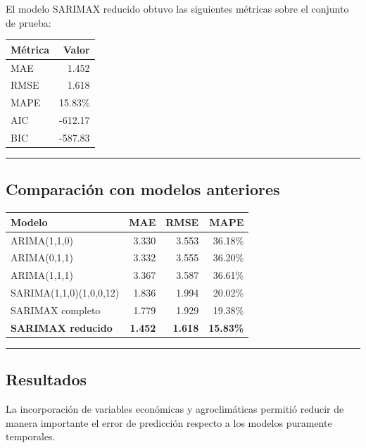 \documentclass[11pt]{article}
\begin{document}
El modelo SARIMAX reducido obtuvo las siguientes métricas sobre el
conjunto de prueba:

\begin{longtable}[]{@{}lr@{}}
\toprule\noalign{}
Métrica & Valor \\
\midrule\noalign{}
\endhead
\bottomrule\noalign{}
\endlastfoot
MAE & 1.452 \\
RMSE & 1.618 \\
MAPE & 15.83\% \\
AIC & -612.17 \\
BIC & -587.83 \\
\end{longtable}

\begin{center}\rule{0.5\linewidth}{0.5pt}\end{center}

\hypertarget{comparaciuxf3n-con-modelos-anteriores}{%
\subsection{Comparación con modelos
anteriores}\label{comparaciuxf3n-con-modelos-anteriores}}

\begin{longtable}[]{@{}lrrr@{}}
\toprule\noalign{}
Modelo & MAE & RMSE & MAPE \\
\midrule\noalign{}
\endhead
\bottomrule\noalign{}
\endlastfoot
ARIMA(1,1,0) & 3.330 & 3.553 & 36.18\% \\
ARIMA(0,1,1) & 3.332 & 3.555 & 36.20\% \\
ARIMA(1,1,1) & 3.367 & 3.587 & 36.61\% \\
SARIMA(1,1,0)(1,0,0,12) & 1.836 & 1.994 & 20.02\% \\
SARIMAX completo & 1.779 & 1.929 & 19.38\% \\
\textbf{SARIMAX reducido} & \textbf{1.452} & \textbf{1.618} &
\textbf{15.83\%} \\
\end{longtable}

\begin{center}\rule{0.5\linewidth}{0.5pt}\end{center}

\hypertarget{resultados}{%
\subsection{Resultados}\label{resultados}}

La incorporación de variables económicas y agroclimáticas permitió
reducir de manera importante el error de predicción respecto a los
modelos puramente temporales.
\end{document}
